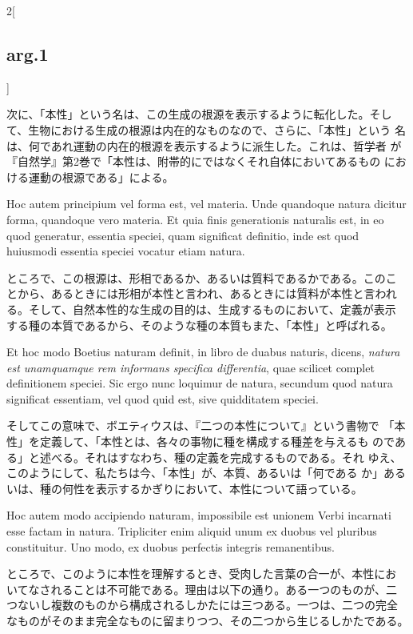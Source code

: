 \documentclass[paper=a4paper,fontsize=10pt,jafontsize=9pt,titlepage]{jlreq}
\begin{document}
\begin{paracol}{2}[\subsection{arg.1}]
\switchcolumn

次に、「本性」という名は、この生成の根源を表示するように転化した。そし
て、生物における生成の根源は内在的なものなので、さらに、「本性」という
名は、何であれ運動の内在的根源を表示するように派生した。これは、哲学者
が『自然学』第2巻で「本性は、附帯的にではなくそれ自体においてあるもの
における運動の根源である」による。

\switchcolumn*

Hoc autem principium vel forma est, vel materia. Unde quandoque natura
dicitur forma, quandoque vero materia. Et quia finis generationis
naturalis est, in eo quod generatur, essentia speciei, quam significat
definitio, inde est quod huiusmodi essentia speciei vocatur etiam
natura.

\switchcolumn

ところで、この根源は、形相であるか、あるいは質料であるかである。このこ
とから、あるときには形相が本性と言われ、あるときには質料が本性と言われ
る。そして、自然本性的な生成の目的は、生成するものにおいて、定義が表示
する種の本質であるから、そのような種の本質もまた、「本性」と呼ばれる。

\switchcolumn*

Et hoc modo Boetius naturam definit, in libro de duabus naturis,
dicens, {\itshape natura est unamquamque rem informans specifica
differentia}, quae scilicet complet definitionem speciei. Sic ergo
nunc loquimur de natura, secundum quod natura significat essentiam,
vel quod quid est, sive quidditatem speciei.

\switchcolumn

そしてこの意味で、ボエティウスは、『二つの本性について』という書物で
「本性」を定義して、「本性とは、各々の事物に種を構成する種差を与えるも
のである」と述べる。それはすなわち、種の定義を完成するものである。それ
ゆえ、このようにして、私たちは今、「本性」が、本質、あるいは「何である
か」あるいは、種の何性を表示するかぎりにおいて、本性について語っている。

\switchcolumn*

Hoc autem modo accipiendo naturam, impossibile est unionem Verbi
incarnati esse factam in natura. Tripliciter enim aliquid unum ex
duobus vel pluribus constituitur. Uno modo, ex duobus perfectis
integris remanentibus.

\switchcolumn

ところで、このように本性を理解するとき、受肉した言葉の合一が、本性にお
いてなされることは不可能である。理由は以下の通り。ある一つのものが、二
つないし複数のものから構成されるしかたには三つある。一つは、二つの完全
なものがそのまま完全なものに留まりつつ、その二つから生じるしかたである。


\end{paracol}
\end{document}
